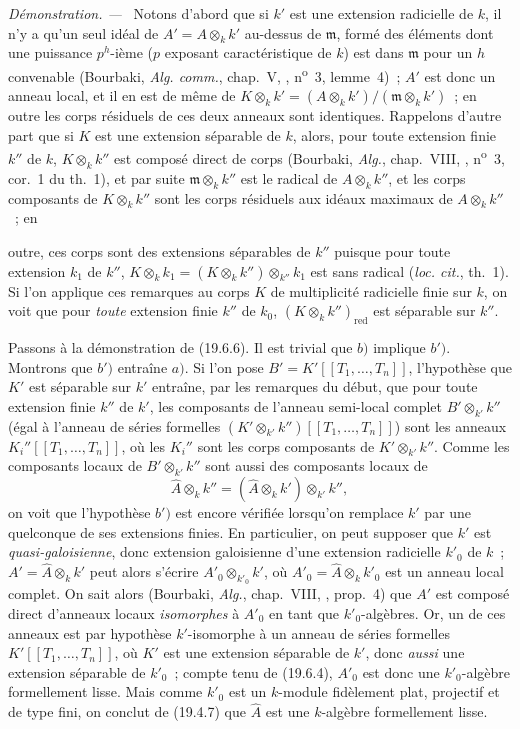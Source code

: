 \documentclass[10pt,oneside]{book}
\newcommand{\oldpage}[2][]{%
  \setcounter{footnote}{0}%
  \marginpar{\scriptsize\textbf{#1}~|~#2}\ignorespaces}
\newenvironment{proof}{%
  \par\medskip\noindent\textit{Démonstration. ---\ }}{\par}
\begin{document}
\begin{proof}
Notons d'abord que si $k'$ est une extension radicielle de $k$, il n'y a qu'un
seul idéal de $A'=A\otimes_k k'$ au-dessus de $\mathfrak m$, formé des éléments
dont une puissance $p^h$-ième ($p$ exposant caractéristique de $k$) est dans
$\mathfrak m$ pour un $h$ convenable (Bourbaki, \emph{Alg. comm.}, chap.~V,
, n\textsuperscript{o}~3, lemme~4)~; $A'$ est donc un anneau
local, et il en est de même de
$K\otimes_k k'=(A\otimes_k k')/(\mathfrak m\otimes_k k')$~; en outre les corps
résiduels de ces deux anneaux sont identiques. Rappelons d'autre part que si
$K$ est une extension séparable de $k$, alors, pour toute extension finie
$k''$ de $k$, $K\otimes_k k''$ est composé direct de corps (Bourbaki,
\emph{Alg.}, chap.~VIII, , n\textsuperscript{o}~3, cor.~1 du
th.~1), et par suite $\mathfrak m\otimes_k k''$ est le radical de
$A\otimes_k k''$, et les corps composants de $K\otimes_k k''$ sont les corps
résiduels aux idéaux maximaux de $A\otimes_k k''$~; en

\oldpage[0\textsubscript{IV-1}]{104}

outre, ces corps sont des extensions séparables de $k''$ puisque pour toute
extension $k_1$ de $k''$,
$K\otimes_k k_1=(K\otimes_k k'')\otimes_{k''}k_1$ est sans radical
(\emph{loc. cit.}, th.~1). Si l'on applique ces remarques au corps $K$ de
multiplicité radicielle finie sur $k$, on voit que pour \emph{toute} extension
finie $k''$ de $k_0$, $(K\otimes_k k'')_{\mathrm{red}}$ est séparable sur
$k''$.

Passons à la démonstration de (19.6.6). Il est trivial que $b)$ implique
$b')$. Montrons que $b')$ entraîne $a)$. Si l'on pose
$B'=K'[[T_1,\ldots,T_n]]$, l'hypothèse que $K'$ est séparable sur $k'$
entraîne, par les remarques du début, que pour toute extension finie $k''$ de
$k'$, les composants de l'anneau semi-local complet $B'\otimes_{k'}k''$
(égal à l'anneau de séries formelles
$(K'\otimes_{k'}k'')[[T_1,\ldots,T_n]]$) sont les anneaux
$K_i''[[T_1,\ldots,T_n]]$, où les $K_i''$ sont les corps composants de
$K'\otimes_{k'}k''$. Comme les composants locaux de $B'\otimes_{k'}k''$ sont
aussi des composants locaux de
\[
  \widehat A\otimes_k k''
  =(\widehat A\otimes_k k')\otimes_{k'}k'',
\]
on voit que l'hypothèse $b')$ est encore vérifiée lorsqu'on remplace $k'$ par
une quelconque de ses extensions finies. En particulier, on peut supposer que
$k'$ est \emph{quasi-galoisienne}, donc extension galoisienne d'une extension
radicielle $k'_0$ de $k$~; $A'=\widehat A\otimes_k k'$ peut alors s'écrire
$A'_0\otimes_{k'_0}k'$, où $A'_0=\widehat A\otimes_k k'_0$ est un anneau
local complet. On sait alors (Bourbaki, \emph{Alg.}, chap.~VIII,
, prop.~4) que $A'$ est composé direct d'anneaux locaux
\emph{isomorphes} à $A'_0$ en tant que $k'_0$-algèbres. Or, un de ces anneaux
est par hypothèse $k'$-isomorphe à un anneau de séries formelles
$K'[[T_1,\ldots,T_n]]$, où $K'$ est une extension séparable de $k'$, donc
\emph{aussi} une extension séparable de $k'_0$~; compte tenu de (19.6.4),
$A'_0$ est donc une $k'_0$-algèbre formellement lisse. Mais comme $k'_0$ est
un $k$-module fidèlement plat, projectif et de type fini, on conclut de
(19.4.7) que $\widehat A$ est une $k$-algèbre formellement lisse.


\end{proof}
\end{document}
